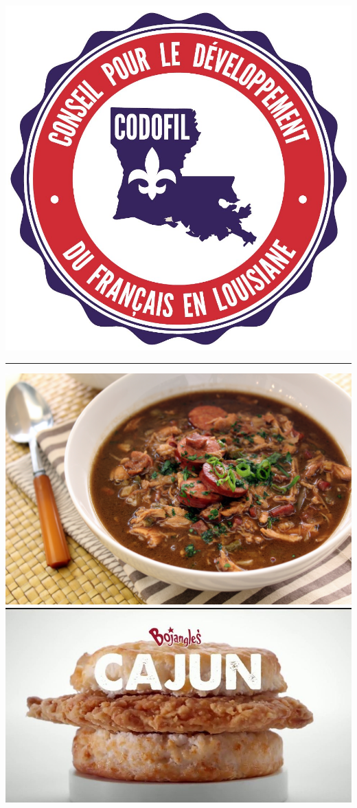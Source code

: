\documentclass{beamer}
\begin{document}
    \begin{frame}{}
      \begin{center}
        \includegraphics[scale=0.09]{codofil.jpg} \\
        \hrule
        \includegraphics[scale=0.025]{gumbo.jpg}
        \includegraphics[scale=0.105]{bojangles_cajun.jpg}

\end{center}
\end{frame}
\end{document}
